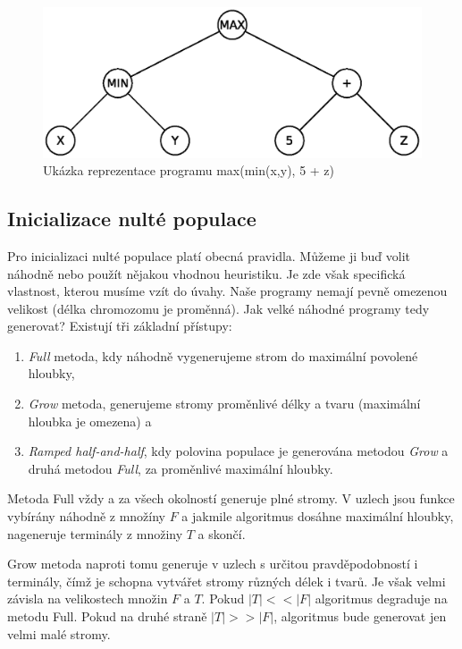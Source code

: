 \begin{figure}[!ht]
	\centering
	\includegraphics[scale=0.6]{fig/example_tree1}	
	\caption{Ukázka reprezentace programu max(min(x,y), 5 + z)}
	\label{fig:exampletree1}
\end{figure}

\subsection{Inicializace nulté populace}

Pro inicializaci nulté populace platí obecná pravidla. Můžeme ji buď volit náhodně
nebo použít nějakou vhodnou heuristiku. Je zde však specifická vlastnost, kterou 
musíme vzít do úvahy. Naše programy nemají pevně omezenou velikost (délka
chromozomu je proměnná). Jak velké náhodné programy tedy generovat? Existují tři
základní přístupy:

\begin{enumerate}
	\item \textit{Full} metoda, kdy náhodně vygenerujeme strom do maximální povolené
		hloubky,
	\item \textit{Grow} metoda, generujeme stromy proměnlivé délky a tvaru (maximální
		hloubka je omezena) a
	\item \textit{Ramped half-and-half}, kdy polovina populace je generována metodou
		\textit{Grow} a druhá metodou \textit{Full}, za proměnlivé maximální hloubky.
\end{enumerate}

Metoda Full vždy a za všech okolností generuje plné stromy. V uzlech jsou funkce
vybírány náhodně z množíny $F$ a jakmile algoritmus dosáhne maximální hloubky,
nageneruje terminály z množiny $T$ a skončí.

Grow metoda naproti tomu generuje v uzlech s určitou pravděpodobností i terminály, čímž
je schopna vytvářet stromy různých délek i tvarů. Je však velmi závisla na velikostech
množin $F$ a $T$. Pokud $|T| << |F|$ algoritmus degraduje na metodu Full. Pokud
na druhé straně $|T| >> |F|$, algoritmus bude generovat jen velmi malé stromy.


